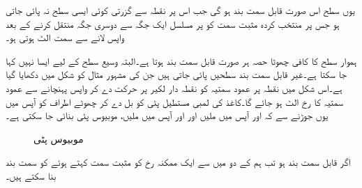 یوں سطح  اس صورت قابل سمت بند ہو گی جب اس پر نقطہ  سے گزرتی کوئی ایسی سطح  نہ پائی جاتی ہو جس پر منتخب کردہ مثبت سمت کو  پر مسلسل ایک جگہ سے دوسری جگہ منتقل کرنے کے بعد واپس  لانے سے سمت الٹ ہوتی ہو۔    

ہموار سطح کا کافی چھوٹا حصہ ہر صورت قابل سمت بند ہوتا ہے۔البتہ وسیع سطح کے لیے ایسا نہیں کہا جا سکتا ہے۔غیر قابل سمت بند سطحیں پائی جاتی ہیں جن کی مشہور مثال  کو شکل  میں دکھایا گیا ہے۔اس شکل میں نقطہ  پر عمود سمتیہ کو نقطہ دار لکیر پر  حرکت دے کر  واپس  پہنچانے سے  عمود سمتیہ کا رخ الٹ ہو جائے گا۔کاغذ کی لمبی مستطیل پٹی کو بل دے کر چھوٹے اطراف کو آپس میں یوں جوڑنے سے کہ  اور  آپس میں ملیں اور  اور  آپس میں ملیں، موبیوس پٹی بنائی جا سکتی ہے۔
\begin{figure}
\centering
\begin{subfigure}{0.45\textwidth}
\centering
{}%
\end{subfigure} \hfill
\begin{subfigure}{0.45\textwidth}
\centering
{}
\end{subfigure}
\caption{موبیوس پٹی}
\label{شکل_خطی_تکمل_موبیوس_پٹی}
\end{figure}
اگر  قابل سمت بند ہو تب ہم  کے  دو میں سے ایک ممکنہ رخ کو مثبت سمت کہتے ہوئے  کو سمت بند بنا سکتے ہیں۔

